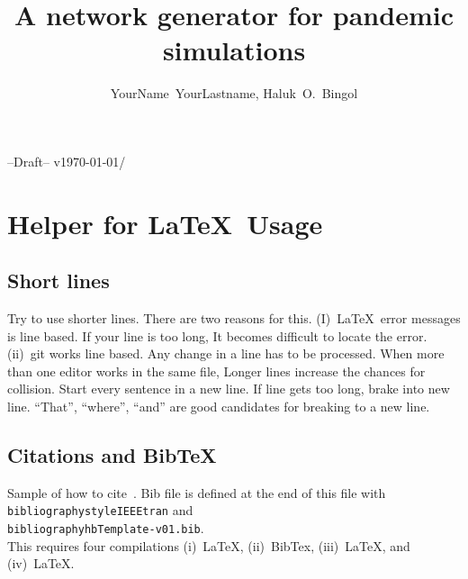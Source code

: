 \documentclass[10pt,journal,compsoc]{IEEEtran}
\newcommand{\hbTimeStamp}{{\color{red}--Draft-- v\today/\currenttime}} %
\theoremstyle{plain}
\theoremstyle{definition}
\theoremstyle{remark}
\begin{document}
\title{
	A network generator for pandemic simulations
}

\author{
	YourName~YourLastname,
	Haluk~O.~Bingol
}


\markboth{
	\hbTimeStamp
}%
{
	\hbTimeStamp
}


\maketitle




\section{Helper for \LaTeX\ Usage}




\subsection{Short lines}

Try to use shorter lines.
There are two reasons for this. 
(I)~\LaTeX\ error messages is line based. 
If your line is too long,
It becomes difficult to locate the error.
(ii)~git works line based. 
Any change in a line has to be processed.
When more than one editor works in the same file,
Longer lines increase the chances for collision.
Start every sentence in a new line.
If line gets too long, brake into new line.
``That'', ``where'', ``and'' are good candidates for breaking to a new line.




\subsection{Citations and BibTeX}
Sample of how to cite~\cite{covid2020modeling}.
Bib file is defined at the end of this file with\\
\texttt{bibliographystyle{IEEEtran}} and\\
\texttt{bibliography{hbTemplate-v01.bib}}.\\
This requires four compilations 
(i)~LaTeX, 
(ii)~BibTex, 
(iii)~LaTeX, and  
(iv)~LaTeX.
\end{document}
